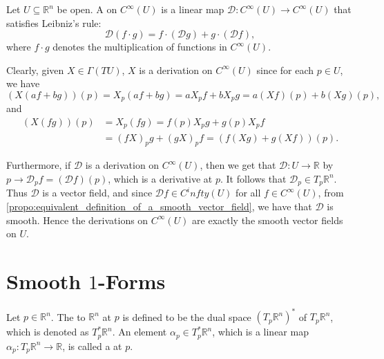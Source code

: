\documentclass[notoc,notitlepage]{tufte-book}
\begin{document}
\begin{defn}\label{defn:derivation_on_c_infty_p_}
  Let $U \subseteq \mathbb{R}^n$ be open. A  on $C^\infty(U)$ is a linear
  map $\mathcal{D} : C^\infty (U) \to C^\infty (U)$ that satisfies Leibniz's rule:
  \begin{equation*}
    \mathcal{D}( f \cdot g ) = f \cdot (\mathcal{D}g) + g \cdot (\mathcal{D}f),
  \end{equation*}
  where $f \cdot g$ denotes the multiplication of functions in $C^\infty(U)$.
\end{defn}

Clearly, given $X \in \Gamma(TU)$, $X$ is a derivation on $C^\infty(U)$ since for each $p \in U$,
we have 
\begin{equation*}
  (X(af + bg))(p) = X_p(af + bg) = aX_p f + bX_p g = a(Xf)(p) + b(Xg)(p),
\end{equation*}
and 
\begin{align*}
  (X(fg))(p) &= X_p(fg) = f(p) X_p g + g(p) X_p f \\
             &= (f X)_p g + (g X)_p f = (f (Xg) + g (Xf))(p).
\end{align*}

Furthermore, if $\mathcal{D}$ is a derivation on $C^\infty(U)$, then we get that $\mathcal{D}
: U \to \mathbb{R}$ by $p \to \mathcal{D}_p f = (\mathcal{D}f)(p)$, which is a derivative at $p$.
It follows that $\mathcal{D}_p \in T_p \mathbb{R}^n$. Thus $\mathcal{D}$ is a vector field, and
since $\mathcal{D}f \in C^infty(U)$ for all $f \in C^\infty(U)$, from
\cref{propo:equivalent_definition_of_a_smooth_vector_field}, we have that $\mathcal{D}$ is smooth.
Hence the derivations on $C^\infty(U)$ are exactly the smooth vector fields on $U$.


\section{Smooth \texorpdfstring{$1$}{1}-Forms}%
\label{sec:smooth_1_forms}

\begin{defn}\label{defn:cotangent_spaces_and_cotangent_vectors}
  Let $p \in \mathbb{R}^n$. The  to $\mathbb{R}^n$ at $p$ is defined
  to be the dual space $(T_p \mathbb{R}^n)^*$ of $T_p \mathbb{R}^n$, which is denoted as
  $T_p^* \mathbb{R}^n$. An element $\alpha_p \in T_p^* \mathbb{R}^n$, which is a linear map
  $\alpha_p : T_p \mathbb{R}^n \to \mathbb{R}$, is called a  at $p$.
\end{defn}
\end{document}

